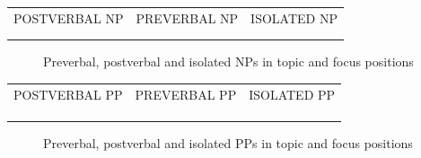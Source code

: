 \documentclass[output=paper]{langscibook}
\begin{document}
\begin{tabularx}{\textwidth}{XXX}

\lsptoprule
 POSTVERBAL NP & PREVERBAL NP & ISOLATED NP\\
  
 \\
& %
\lspbottomrule
\end{tabularx}
\begin{figure}
\caption{Preverbal, postverbal and isolated NPs in topic and focus positions}
\label{fig:key:8}
\end{figure}


\begin{tabularx}{\textwidth}{XXX}

\lsptoprule
 POSTVERBAL PP & PREVERBAL PP & ISOLATED PP\\
  
  
 \\
\multicolumn{3}{c}{%
}\\
\lspbottomrule
\end{tabularx}
\begin{figure}
\caption{Preverbal, postverbal and isolated PPs in topic and focus positions} 
\label{fig:key:9}
\end{figure}
\end{document}
